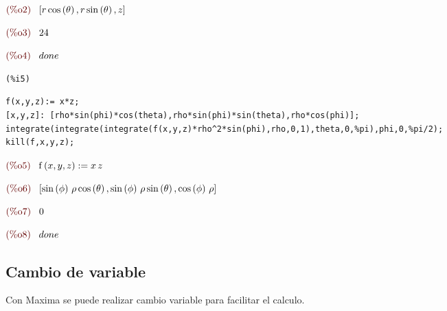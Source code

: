 \documentclass[12pt]{article}
\begin{document}
\begin{math}\displaystyle
\parbox{8ex}{\color{labelcolor}(\%o2) }
[r\,\mathrm{cos}\left( \theta\right) ,r\,\mathrm{sin}\left( \theta\right) ,z]
\end{math}

\begin{math}\displaystyle
\parbox{8ex}{\color{labelcolor}(\%o3) }
24
\end{math}

\begin{math}\displaystyle
\parbox{8ex}{\color{labelcolor}(\%o4) }
done
\end{math}


\noindent
\begin{minipage}[t]{8ex}{\color{red}\bf
\begin{verbatim}
(%i5) 
\end{verbatim}}
\end{minipage}
\begin{minipage}[t]{\textwidth}{\color{blue}
\begin{verbatim}
f(x,y,z):= x*z;
[x,y,z]: [rho*sin(phi)*cos(theta),rho*sin(phi)*sin(theta),rho*cos(phi)];
integrate(integrate(integrate(f(x,y,z)*rho^2*sin(phi),rho,0,1),theta,0,%pi),phi,0,%pi/2);
kill(f,x,y,z);
\end{verbatim}}
\end{minipage}
\begin{math}\displaystyle
\parbox{8ex}{\color{labelcolor}(\%o5) }
\mathrm{f}\left( x,y,z\right) :=x\,z
\end{math}

\begin{math}\displaystyle
\parbox{8ex}{\color{labelcolor}(\%o6) }
[\mathrm{sin}\left( \phi\right) \,\rho\,\mathrm{cos}\left( \theta\right) ,\mathrm{sin}\left( \phi\right) \,\rho\,\mathrm{sin}\left( \theta\right) ,\mathrm{cos}\left( \phi\right) \,\rho]
\end{math}

\begin{math}\displaystyle
\parbox{8ex}{\color{labelcolor}(\%o7) }
0
\end{math}

\begin{math}\displaystyle
\parbox{8ex}{\color{labelcolor}(\%o8) }
done
\end{math}

\subsection{Cambio de variable}
Con Maxima se puede realizar cambio variable para facilitar el calculo.
\end{document}
